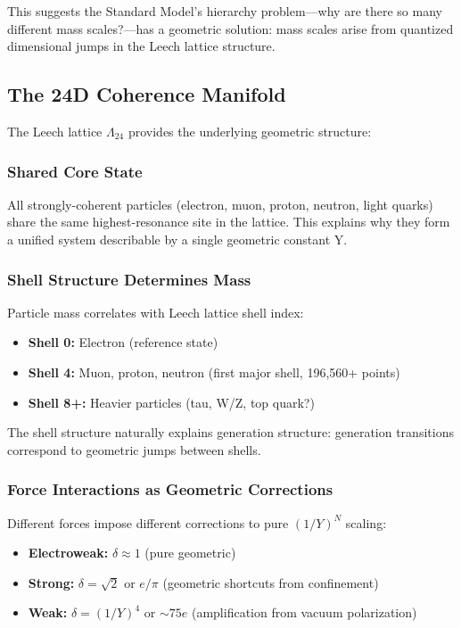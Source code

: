 \documentclass[11pt,twocolumn]{article}
\begin{document}
This suggests the Standard Model's hierarchy problem—why are there so many different mass scales?—has a geometric solution: mass scales arise from quantized dimensional jumps in the Leech lattice structure.

\subsection{The 24D Coherence Manifold}

The Leech lattice $\Lambda_{24}$ provides the underlying geometric structure:

\subsubsection{Shared Core State}

All strongly-coherent particles (electron, muon, proton, neutron, light quarks) share the same highest-resonance site in the lattice. This explains why they form a unified system describable by a single geometric constant Y.

\subsubsection{Shell Structure Determines Mass}

Particle mass correlates with Leech lattice shell index:

\begin{itemize}
\item \textbf{Shell 0:} Electron (reference state)
\item \textbf{Shell 4:} Muon, proton, neutron (first major shell, 196,560+ points)
\item \textbf{Shell 8+:} Heavier particles (tau, W/Z, top quark?)
\end{itemize}

The shell structure naturally explains generation structure: generation transitions correspond to geometric jumps between shells.

\subsubsection{Force Interactions as Geometric Corrections}

Different forces impose different corrections to pure $(1/Y)^N$ scaling:

\begin{itemize}
\item \textbf{Electroweak:} $\delta \approx 1$ (pure geometric)
\item \textbf{Strong:} $\delta = \sqrt{2}$ or $e/\pi$ (geometric shortcuts from confinement)
\item \textbf{Weak:} $\delta = (1/Y)^4$ or $\sim 75e$ (amplification from vacuum polarization)
\end{itemize}
\end{document}
